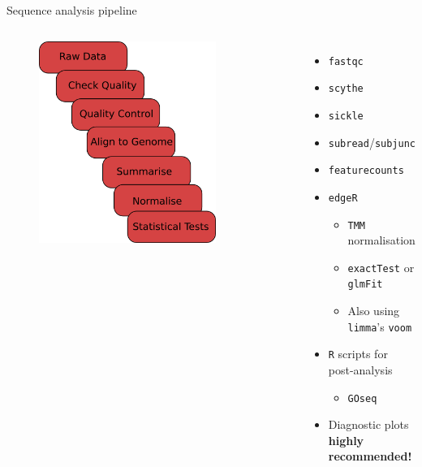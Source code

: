 \documentclass[t]{beamer}
\begin{document}
\begin{frame}{Sequence analysis pipeline}
  \begin{columns}[t]
      \begin{figure}[h]
        \begin{center}
          \includegraphics[width=0.8\textwidth]{img/informaticsFD.png}
        \end{center}
      \end{figure}
      \begin{itemize}
        \item \texttt{fastqc}
        \item \texttt{scythe}
        \item \texttt{sickle}
        \item \texttt{subread}/\texttt{subjunc}
        \item \texttt{featurecounts}
        \item \texttt{edgeR}
          \begin{itemize}
            \item \texttt{TMM} normalisation
            \item \texttt{exactTest} or \texttt{glmFit}
            \item Also using \texttt{limma}'s \texttt{voom}
          \end{itemize}
        \item \texttt{R} scripts for post-analysis
          \begin{itemize}
            \item \texttt{GOseq}
          \end{itemize}
          \item Diagnostic plots \textbf{highly recommended!}
      \end{itemize}
  \end{columns}
\end{frame}
\end{document}
